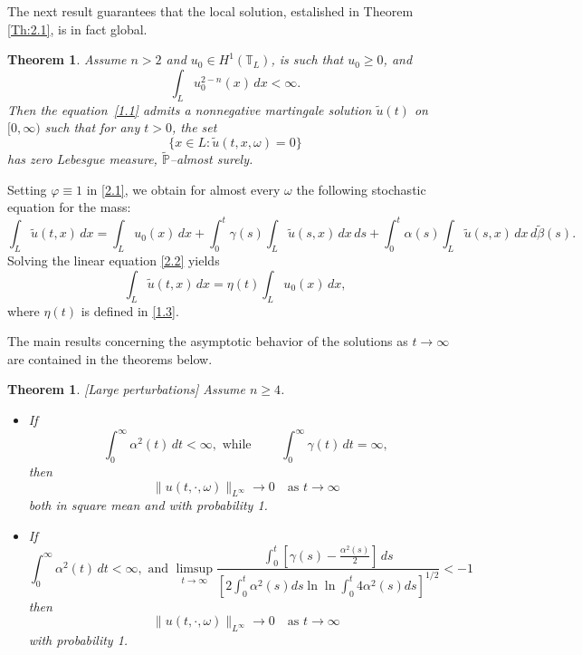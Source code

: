 \documentclass[a4paper,12pt]{article}
\newtheorem{theorem}[definition]{Theorem}
\numberwithin{equation}{section}
\def\tu{\tilde{u}}
\begin{document}
The next result guarantees that the local solution, estalished in Theorem \ref{Th:2.1}, is in fact global.

\begin{theorem}\label{th:2.2}
Assume $n>2$ and $u_0 \in H^1(\mathbb{T}_L)$, is such that $u_0 \ge 0$, and
\[
\int_L u_0^{2-n}(x) \, dx < \infty.
\]
Then the equation~\eqref{1.1} admits a nonnegative martingale solution
$\tu(t)$ on $[0,\infty)$ such that for any $t>0$,
the set
\[
\{x \in L : \tu(t,x,\omega)=0\}
\]
has zero Lebesgue measure, $\tilde{\mathbb{P}}$--almost surely.
\end{theorem}

\medskip

Setting $\varphi \equiv 1$ in \eqref{2.1}, we obtain for almost every $\omega$
the following stochastic equation for the mass:
\begin{equation}
\int_{L} \tu(t,x)\,dx
=
\int_{L} u_0(x)\,dx
+
\int_0^t \gamma(s) \int_{L} \tu(s,x)\,dx\,ds
+
\int_0^t \alpha(s) \int_{L} \tu(s,x)\,dx\,d \tilde{\beta}(s).
\label{2.2}
\end{equation}
Solving the linear equation \eqref{2.2} yields
\begin{equation*}
\int_{L} \tu(t,x)\,dx = \eta(t) \int_{L} u_0(x)\,dx,
\label{2.3}
\end{equation*}
where $\eta(t)$ is defined in \eqref{1.3}.

The main results concerning the asymptotic behavior of the solutions as $t \to \infty$ are contained in the theorems below.



\begin{theorem} \label{Th:2.3}[Large perturbations] 
Assume $n \ge 4$. 
\begin{itemize}
    \item 
If
\begin{equation}
\int_0^\infty \alpha^2(t) \, dt < \infty, \text { while }
\qquad
\int_0^\infty \gamma(t) \, dt = \infty,
\label{2.4}
\end{equation}
then
\[
\|u(t,\cdot, \omega)\|_{L^\infty} \to 0
\quad \text{as } t \to \infty
\]
both in square mean and with probability 1. 
\item If 
\begin{equation}\label{2.6}
\int_0^\infty \alpha^2(t) \, dt < \infty, \text{ and } \limsup_{t \to \infty} \frac{\int_0^t [\gamma(s) - \frac{\alpha^2(s)}{2}] \, ds}{[2 \int_0^t \alpha^2(s) ds \ln \ln \int_0^t 4 \alpha^2(s) ds]^{1/2}} < -1
\end{equation}
then
\[
\|u(t,\cdot, \omega)\|_{L^\infty} \to 0
\quad \text{as } t \to \infty
\]
with probability 1. 
\end{itemize}
\end{theorem}
\end{document}
